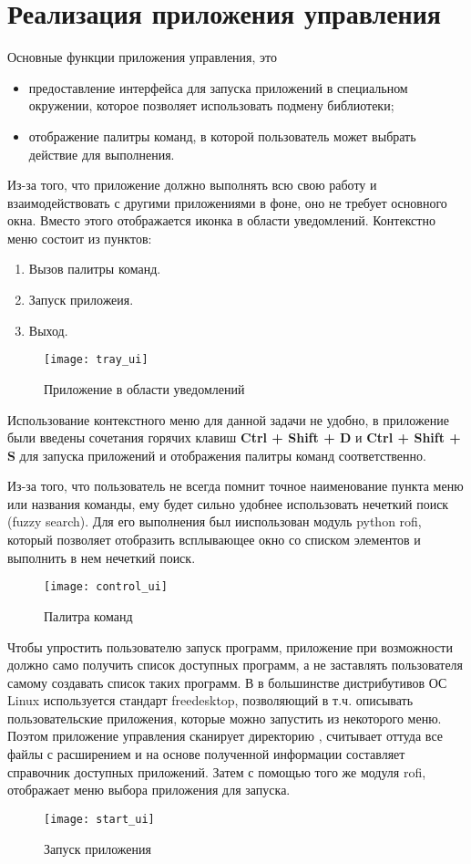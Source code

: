 \section{Реализация приложения управления}

Основные функции приложения управления, это
\begin{itemize}
    \item предоставление интерфейса для запуска приложений в специальном
    окружении, которое позволяет использовать подмену библиотеки;
    \item отображение палитры команд, в которой пользователь может выбрать
    действие для выполнения.
\end{itemize}

Из-за того, что приложение должно выполнять всю свою работу и взаимодействовать
с другими приложениями в фоне, оно не требует основного окна. Вместо этого
отображается иконка в области уведомлений. Контекстно меню состоит из пунктов:

\begin{enumerate}
    \item Вызов палитры команд.
    \item Запуск приложеия.
    \item Выход.
\end{enumerate}

\begin{figure}[h]
    \centering
    \texttt{[image: tray\_ui]}
    \caption{Приложение в области уведомлений}
\end{figure}

Использование контекстного меню для данной задачи не удобно, в приложение
были введены сочетания горячих клавиш \textbf{Ctrl + Shift + D} и
\textbf{Ctrl + Shift + S} для запуска приложений и отображения палитры команд
соответственно.

Из-за того, что пользователь не всегда помнит точное наименование пункта меню
или названия команды, ему будет сильно удобнее использовать нечеткий поиск
(fuzzy search). Для его выполнения был ииспользован модуль python rofi, который
позволяет отобразить всплывающее окно со списком элементов и выполнить в нем
нечеткий поиск.

\begin{figure}[h]
    \centering
    \texttt{[image: control\_ui]}
    \caption{Палитра команд}
\end{figure}

Чтобы упростить пользователю запуск программ, приложение при возможности должно
само получить список доступных программ, а не заставлять пользователя самому
создавать список таких программ. В в большинстве дистрибутивов ОС Linux
используется стандарт freedesktop, позволяющий в т.ч. описывать пользовательские
приложения, которые можно запустить из некоторого меню. Поэтом приложение
управления сканирует директорию , считывает оттуда
все файлы с расширением  и на основе полученной информации
составляет справочник доступных приложений. Затем с помощью того же модуля rofi,
отображает меню выбора приложения для запуска.

\begin{figure}[h]
    \centering
    \texttt{[image: start\_ui]}
    \caption{Запуск приложения}
\end{figure}
